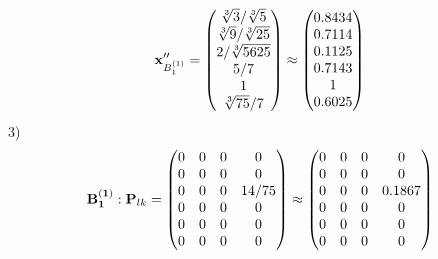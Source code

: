 \documentclass[10pt,a4paper]{article}
\begin{document}
	\[
		\bold{x}''_{B_1^{(1)}} = 
		\begin{pmatrix}
			{\sqrt[3]{3}} / {\sqrt[3]{5}} \\
			{\sqrt[3]{9}} / {\sqrt[3]{25}} \\
			{{2}} / {\sqrt[3]{5625}} \\
			{{5}} / {{7}} \\
			{1}{} \\
			{\sqrt[3]{75}} / {{7}} \\
		\end{pmatrix}
		\approx
		\begin{pmatrix}
			0.8434   \\
			0.7114   \\
			0.1125   \\
			0.7143   \\
			1        \\
			0.6025   \\
		\end{pmatrix}
	\]
	3)
	\[
		\bold{B_1^{(1)}}: \bold{P}_{lk} = 
		\begin{pmatrix}
			{{0}}{} & {{0}}{} & {{0}}{} & {{0}}{} \\
			{{0}}{} & {{0}}{} & {{0}}{} & {{0}}{} \\
			{{0}}{} & {{0}}{} & {{0}}{} & {{14}} / {{75}} \\
			{{0}}{} & {{0}}{} & {{0}}{} & {{0}}{} \\
			{{0}}{} & {{0}}{} & {{0}}{} & {{0}}{} \\
			{{0}}{} & {{0}}{} & {{0}}{} & {{0}}{} \\
		\end{pmatrix}
		\approx
		\begin{pmatrix}
			0        & 0        & 0        & 0        \\
			0        & 0        & 0        & 0        \\
			0        & 0        & 0        & 0.1867   \\
			0        & 0        & 0        & 0        \\
			0        & 0        & 0        & 0        \\
			0        & 0        & 0        & 0        \\
		\end{pmatrix}
	\]
\end{document}

